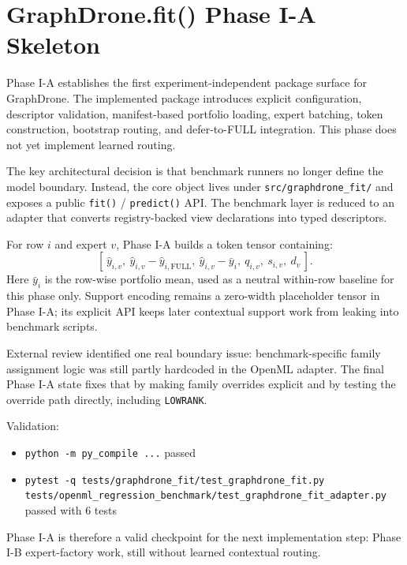 \section{GraphDrone.fit() Phase I-A Skeleton}

Phase I-A establishes the first experiment-independent package surface for GraphDrone. The implemented package introduces explicit configuration, descriptor validation, manifest-based portfolio loading, expert batching, token construction, bootstrap routing, and defer-to-FULL integration. This phase does not yet implement learned routing.

The key architectural decision is that benchmark runners no longer define the model boundary. Instead, the core object lives under \texttt{src/graphdrone\_fit/} and exposes a public \texttt{fit()} / \texttt{predict()} API. The benchmark layer is reduced to an adapter that converts registry-backed view declarations into typed descriptors.

For row $i$ and expert $v$, Phase I-A builds a token tensor containing:
\[
[\,\hat y_{i,v},\ \hat y_{i,v} - \hat y_{i,\mathrm{FULL}},\ \hat y_{i,v} - \bar y_i,\ q_{i,v},\ s_{i,v},\ d_v\,].
\]
Here $\bar y_i$ is the row-wise portfolio mean, used as a neutral within-row baseline for this phase only. Support encoding remains a zero-width placeholder tensor in Phase I-A; its explicit API keeps later contextual support work from leaking into benchmark scripts.

External review identified one real boundary issue: benchmark-specific family assignment logic was still partly hardcoded in the OpenML adapter. The final Phase I-A state fixes that by making family overrides explicit and by testing the override path directly, including \texttt{LOWRANK}.

Validation:
\begin{itemize}
\item \texttt{python -m py\_compile ...} passed
\item \texttt{pytest -q tests/graphdrone\_fit/test\_graphdrone\_fit.py tests/openml\_regression\_benchmark/test\_graphdrone\_fit\_adapter.py} passed with 6 tests
\end{itemize}

Phase I-A is therefore a valid checkpoint for the next implementation step: Phase I-B expert-factory work, still without learned contextual routing.

